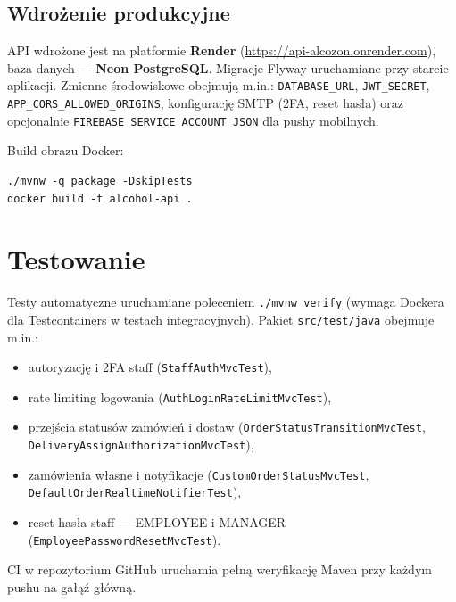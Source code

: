 \documentclass[12pt,a4paper]{report}
\newcommand{\blok}[1]{\needspace{9\baselineskip}#1}
\newenvironment{calosc}{%
  \Needspace{14\baselineskip}%
  \begin{samepage}%
}{%
  \end{samepage}%
}
\begin{document}
\begin{calosc}
\section{Wdrożenie produkcyjne}

API wdrożone jest na platformie \textbf{Render} (\url{https://api-alcozon.onrender.com}), baza danych --- \textbf{Neon PostgreSQL}. Migracje Flyway uruchamiane przy starcie aplikacji. Zmienne środowiskowe obejmują m.in.: \texttt{DATABASE\_URL}, \texttt{JWT\_SECRET}, \texttt{APP\_CORS\_ALLOWED\_ORIGINS}, konfigurację SMTP (2FA, reset hasła) oraz opcjonalnie \texttt{FIREBASE\_SERVICE\_ACCOUNT\_JSON} dla pushy mobilnych.

Build obrazu Docker:
\begin{lstlisting}[style=shell]
./mvnw -q package -DskipTests
docker build -t alcohol-api .
\end{lstlisting}
\end{calosc}

\chapter{Testowanie}

\blok{%
Testy automatyczne uruchamiane poleceniem \texttt{./mvnw verify} (wymaga Dockera dla Testcontainers w testach integracyjnych). Pakiet \texttt{src/test/java} obejmuje m.in.:
}

\begin{itemize}[noitemsep]
  \item autoryzację i 2FA staff (\texttt{StaffAuthMvcTest}),
  \item rate limiting logowania (\texttt{AuthLoginRateLimitMvcTest}),
  \item przejścia statusów zamówień i dostaw (\texttt{OrderStatusTransitionMvcTest}, \texttt{DeliveryAssignAuthorizationMvcTest}),
  \item zamówienia własne i notyfikacje (\texttt{CustomOrderStatusMvcTest}, \texttt{DefaultOrderRealtimeNotifierTest}),
  \item reset hasła staff --- EMPLOYEE i MANAGER (\texttt{EmployeePasswordResetMvcTest}).
\end{itemize}

CI w repozytorium GitHub uruchamia pełną weryfikację Maven przy każdym pushu na gałąź główną.
\end{document}
